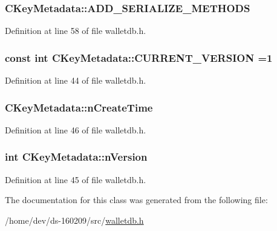 \subsubsection[{A\+D\+D\+\_\+\+S\+E\+R\+I\+A\+L\+I\+Z\+E\+\_\+\+M\+E\+T\+H\+O\+D\+S}]{\setlength{\rightskip}{0pt plus 5cm}C\+Key\+Metadata\+::\+A\+D\+D\+\_\+\+S\+E\+R\+I\+A\+L\+I\+Z\+E\+\_\+\+M\+E\+T\+H\+O\+D\+S}\label{class_c_key_metadata_a7e1f57544d6d63342bddeee5a08aba1a}


Definition at line 58 of file walletdb.\+h.

\hypertarget{class_c_key_metadata_a805f9472960eec81031596ce1133e629}{}
\subsubsection[{C\+U\+R\+R\+E\+N\+T\+\_\+\+V\+E\+R\+S\+I\+O\+N}]{\setlength{\rightskip}{0pt plus 5cm}const int C\+Key\+Metadata\+::\+C\+U\+R\+R\+E\+N\+T\+\_\+\+V\+E\+R\+S\+I\+O\+N =1\hspace{0.3cm}{\ttfamily [static]}}\label{class_c_key_metadata_a805f9472960eec81031596ce1133e629}


Definition at line 44 of file walletdb.\+h.

\hypertarget{class_c_key_metadata_accfd31222aefcbdcba1fb0214e546e6d}{}
\subsubsection[{n\+Create\+Time}]{ C\+Key\+Metadata\+::n\+Create\+Time}\label{class_c_key_metadata_accfd31222aefcbdcba1fb0214e546e6d}


Definition at line 46 of file walletdb.\+h.

\hypertarget{class_c_key_metadata_a52f63ceb60b53e491666b6aa59a4d818}{}
\subsubsection[{n\+Version}]{\setlength{\rightskip}{0pt plus 5cm}int C\+Key\+Metadata\+::n\+Version}\label{class_c_key_metadata_a52f63ceb60b53e491666b6aa59a4d818}


Definition at line 45 of file walletdb.\+h.



The documentation for this class was generated from the following file\+:\begin{DoxyCompactItemize}
\item 
/home/dev/ds-\/160209/src/\hyperlink{walletdb_8h}{walletdb.\+h}\end{DoxyCompactItemize}
